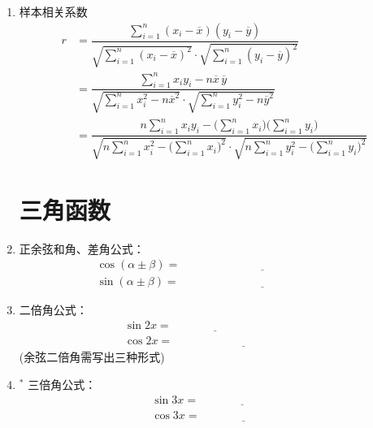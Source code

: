 \documentclass{article}
\newif\ifte
\begin{document}
\begin{multicols}{2}
\begin{enumerate}[leftmargin=20pt]
\item 样本相关系数
\begin{align*}    
    r &=\dfrac{\sum\limits_{i=1}^{n}(x_i-\overline{x})(y_i-\overline{y})}
    { \sqrt{\sum\limits_{i=1}^{n}(x_i-\overline{x})^2}\cdot 
        \sqrt{\sum\limits_{i=1}^{n}(y_i-\overline{y})^2} } \\
    &=\dfrac{\sum\limits_{i=1}^{n}x_iy_i-n\overline{x}\, \overline{y}}
    {\sqrt{\sum\limits_{i=1}^{n}x_i^2-n\overline{x}^2}\cdot 
     \sqrt{\sum\limits_{i=1}^{n}y_i^2-n\overline{y}^2}} \\
    &=\dfrac{n\sum\limits_{i=1}^{n}x_iy_i-\Big(\sum\limits_{i=1}^{n}x_i\Big)
        \Big(\sum\limits_{i=1}^{n}y_i\Big)}{
        \sqrt{n\sum\limits_{i=1}^{n}x_i^2-\Big(\sum\limits_{i=1}^{n}x_i\Big)^2}\cdot
        \sqrt{n\sum\limits_{i=1}^{n}y_i^2-\Big(\sum\limits_{i=1}^{n}y_i\Big)^2} } 
\end{align*}

\section{三角函数}
\item 正余弦和角、差角公式：
\begin{align*} 
    \cos(\alpha\pm\beta )=&\ \underline{\ \ifte 
    \cos\alpha\cos\beta \mp \sin\alpha\sin\beta 
    \else \hspace{5cm} \fi\ } \\
    \sin(\alpha\pm\beta )=&\ \underline{\ \ifte 
    \sin\alpha\cos\beta \pm \cos\alpha\sin\beta    
        \else \hspace{5cm} \fi\ } 
\end{align*}

\item 二倍角公式：
\begin{align*}
    & \sin 2x=\underline{\ \ifte 2\sin x\cos x
        \else \hspace{3cm} \fi\ } \\    
    & \cos 2x=\underline{\ \ifte 2\cos^2 x-1=1-2
     \sin^2 x=\cos^2 x- \sin^2 x\else \hspace{5cm} \fi\ }
\end{align*}
\ifte \else (余弦二倍角需写出三种形式) \fi

\item $^*$ 三倍角公式：
\begin{align*} 
    & \sin 3x=\underline{\ \ifte -4 \sin^3 x+ 3\sin x
        \else \hspace{3cm} \fi\ } 	  \\	
    & \cos 3x=\underline{\ \ifte 4 \cos^3 x- 3\cos x
        \else \hspace{3cm} \fi\ } 
\end{align*}



\end{enumerate}
\end{multicols}
\end{document}
